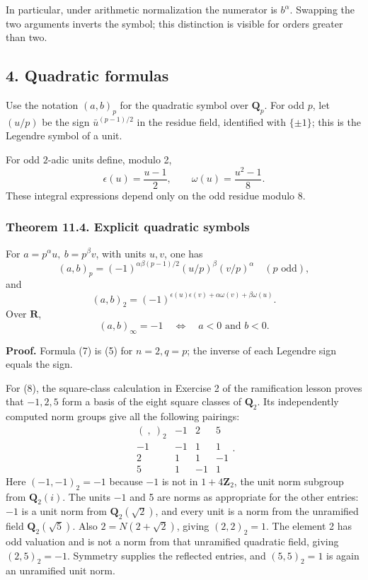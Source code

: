 \documentclass[11pt,a4paper]{article}
\begin{document}
In particular, under arithmetic normalization the numerator is
\(b^\alpha\). Swapping the two arguments inverts the symbol; this
distinction is visible for orders greater than two.

\subsection{4. Quadratic formulas}\label{quadratic-formulas}

Use the notation \((a,b)_p\) for the quadratic symbol over
\(\mathbf Q_p\). For odd \(p\), let \((u/p)\) be the sign
\(\bar u^{(p-1)/2}\) in the residue field, identified with \(\{\pm1\}\);
this is the Legendre symbol of a unit.

For odd \(2\)-adic units define, modulo 2, \[
\epsilon(u)=\frac{u-1}{2},\qquad
\omega(u)=\frac{u^2-1}{8}.
\tag{6}
\] These integral expressions depend only on the odd residue modulo 8.

\subsubsection{Theorem 11.4. Explicit quadratic
symbols}\label{theorem-11.4.-explicit-quadratic-symbols}

For \(a=p^\alpha u,\ b=p^\beta v\), with units \(u,v\), one has \[
(a,b)_p=(-1)^{\alpha\beta(p-1)/2}
           (u/p)^\beta(v/p)^\alpha\quad(p\text{ odd}),
\tag{7}
\] and \[
(a,b)_2=(-1)^{\epsilon(u)\epsilon(v)
                       +\alpha\omega(v)+\beta\omega(u)}.
\tag{8}
\] Over \(\mathbf R\), \[
(a,b)_\infty=-1
\quad\Longleftrightarrow\quad a<0\text{ and }b<0.
\tag{9}
\]

\textbf{Proof.} Formula (7) is (5) for \(n=2,q=p\); the inverse of each
Legendre sign equals the sign.

For (8), the square-class calculation in Exercise 2 of the ramification
lesson proves that \(-1,2,5\) form a basis of the eight square classes
of \(\mathbf Q_2\). Its independently computed norm groups give all the
following pairings: \[
\begin{array}{c|ccc}
(\ ,\ )_2&-1&2&5\\ \hline
-1&-1&1&1\\
2&1&1&-1\\
5&1&-1&1
\end{array}.
\tag{10}
\] Here \((-1,-1)_2=-1\) because \(-1\) is not in \(1+4\mathbf Z_2\),
the unit norm subgroup from \(\mathbf Q_2(i)\). The units \(-1\) and 5
are norms as appropriate for the other entries: \(-1\) is a unit norm
from \(\mathbf Q_2(\sqrt2)\), and every unit is a norm from the
unramified field \(\mathbf Q_2(\sqrt5)\). Also \(2=N(2+\sqrt2)\), giving
\((2,2)_2=1\). The element 2 has odd valuation and is not a norm from
that unramified quadratic field, giving \((2,5)_2=-1\). Symmetry
supplies the reflected entries, and \((5,5)_2=1\) is again an unramified
unit norm.
\end{document}

